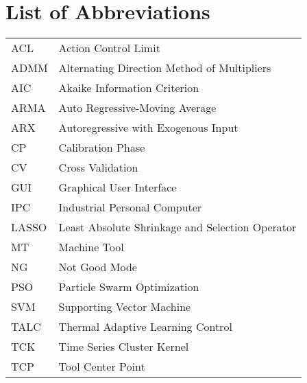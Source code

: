 \chapter*{List of Abbreviations}


\begin{tabular}{ll} 


ACL & \hspace{1cm} Action Control Limit\\
ADMM & \hspace{1cm} Alternating Direction Method of Multipliers\\
AIC & \hspace{1cm} Akaike Information Criterion\\
ARMA & \hspace{1cm} Auto Regressive-Moving Average \\
ARX & \hspace{1cm} Autoregressive with Exogenous Input\\
CP & \hspace{1cm} Calibration Phase\\
CV & \hspace{1cm} Cross Validation\\
GUI & \hspace{1cm} Graphical User Interface\\
IPC & \hspace{1cm} Industrial Personal Computer\\
LASSO & \hspace{1cm} Least Absolute Shrinkage and Selection Operator\\
MT & \hspace{1cm} Machine Tool\\
NG & \hspace{1cm} Not Good Mode\\
PSO & \hspace{1cm} Particle Swarm Optimization\\
SVM & \hspace{1cm} Supporting Vector Machine\\
TALC & \hspace{1cm} Thermal Adaptive Learning Control\\
TCK & \hspace{1cm} Time Series Cluster Kernel\\
TCP & \hspace{1cm} Tool Center Point\\


\end{tabular}
\label{tab:einflusparameter}






 
